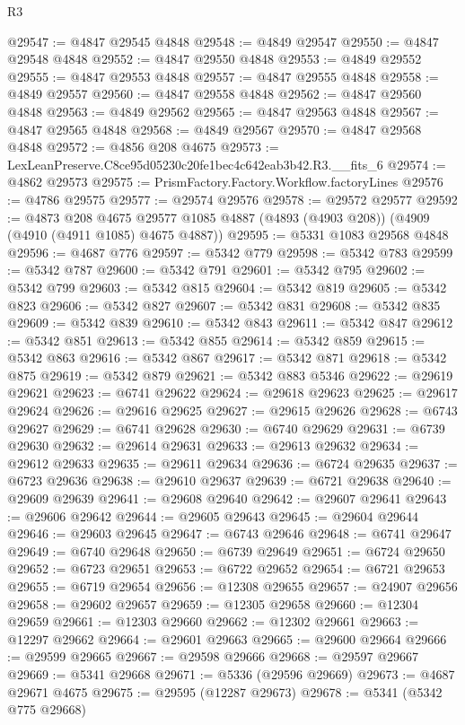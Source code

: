 \begin{lexlean}{R3}
\begin{coremodule}
@29547 := @4847 @29545 @4848
@29548 := @4849 @29547
@29550 := @4847 @29548 @4848
@29552 := @4847 @29550 @4848
@29553 := @4849 @29552
@29555 := @4847 @29553 @4848
@29557 := @4847 @29555 @4848
@29558 := @4849 @29557
@29560 := @4847 @29558 @4848
@29562 := @4847 @29560 @4848
@29563 := @4849 @29562
@29565 := @4847 @29563 @4848
@29567 := @4847 @29565 @4848
@29568 := @4849 @29567
@29570 := @4847 @29568 @4848
@29572 := @4856 @208 @4675
@29573 := LexLeanPreserve.C8ce95d05230c20fe1bec4c642eab3b42.R3.__fits_6
@29574 := @4862 @29573
@29575 := PrismFactory.Factory.Workflow.factoryLines
@29576 := @4786 @29575
@29577 := @29574 @29576
@29578 := @29572 @29577
@29592 := @4873
    @208
    @4675
    @29577
    @1085
    @4887
    (@4893 (@4903 @208))
    (@4909 (@4910 (@4911 @1085) @4675 @4887))
@29595 := @5331 @1083 @29568 @4848
@29596 := @4687 @776
@29597 := @5342 @779
@29598 := @5342 @783
@29599 := @5342 @787
@29600 := @5342 @791
@29601 := @5342 @795
@29602 := @5342 @799
@29603 := @5342 @815
@29604 := @5342 @819
@29605 := @5342 @823
@29606 := @5342 @827
@29607 := @5342 @831
@29608 := @5342 @835
@29609 := @5342 @839
@29610 := @5342 @843
@29611 := @5342 @847
@29612 := @5342 @851
@29613 := @5342 @855
@29614 := @5342 @859
@29615 := @5342 @863
@29616 := @5342 @867
@29617 := @5342 @871
@29618 := @5342 @875
@29619 := @5342 @879
@29621 := @5342 @883 @5346
@29622 := @29619 @29621
@29623 := @6741 @29622
@29624 := @29618 @29623
@29625 := @29617 @29624
@29626 := @29616 @29625
@29627 := @29615 @29626
@29628 := @6743 @29627
@29629 := @6741 @29628
@29630 := @6740 @29629
@29631 := @6739 @29630
@29632 := @29614 @29631
@29633 := @29613 @29632
@29634 := @29612 @29633
@29635 := @29611 @29634
@29636 := @6724 @29635
@29637 := @6723 @29636
@29638 := @29610 @29637
@29639 := @6721 @29638
@29640 := @29609 @29639
@29641 := @29608 @29640
@29642 := @29607 @29641
@29643 := @29606 @29642
@29644 := @29605 @29643
@29645 := @29604 @29644
@29646 := @29603 @29645
@29647 := @6743 @29646
@29648 := @6741 @29647
@29649 := @6740 @29648
@29650 := @6739 @29649
@29651 := @6724 @29650
@29652 := @6723 @29651
@29653 := @6722 @29652
@29654 := @6721 @29653
@29655 := @6719 @29654
@29656 := @12308 @29655
@29657 := @24907 @29656
@29658 := @29602 @29657
@29659 := @12305 @29658
@29660 := @12304 @29659
@29661 := @12303 @29660
@29662 := @12302 @29661
@29663 := @12297 @29662
@29664 := @29601 @29663
@29665 := @29600 @29664
@29666 := @29599 @29665
@29667 := @29598 @29666
@29668 := @29597 @29667
@29669 := @5341 @29668
@29671 := @5336 (@29596 @29669)
@29673 := @4687 @29671 @4675
@29675 := @29595 (@12287 @29673)
@29678 := @5341 (@5342 @775 @29668)

\end{coremodule}
\end{lexlean}
